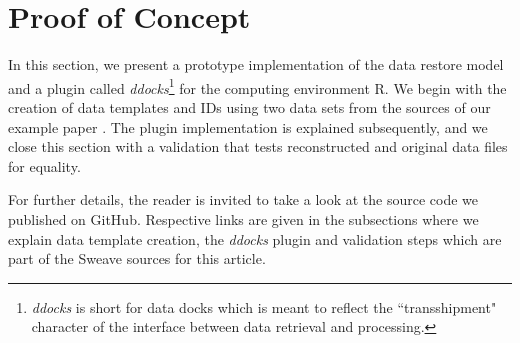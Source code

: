 \documentclass{acm_proc_article-sp}
\begin{document}




























\section{Proof of Concept}\label{sec:impl}

In this section, we present a prototype implementation of the data restore model and a plugin called \textit{ddocks}\footnote{\textit{ddocks} is short for data docks which is meant to reflect the ``transshipment" character of the interface between data retrieval and processing.} 
for the computing environment R.
We begin with the creation of data templates and IDs using two data sets from the sources of our example paper \cite{KoenkerZeileis2009}.
The plugin implementation is explained subsequently, and we close this section with a validation that tests reconstructed and original data files for equality.


For further details, the reader is invited to take a look at the source code we published on GitHub.
Respective links are given in the subsections
where we explain data template creation, the \textit{ddocks} plugin and validation steps which are part of the Sweave sources for this article.
\end{document}
